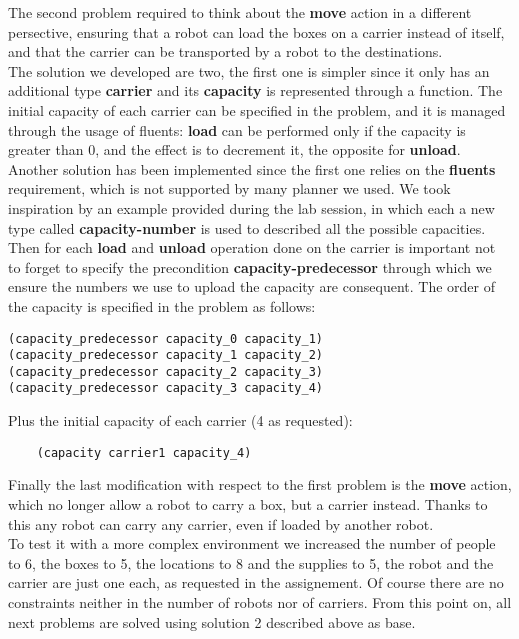 The second problem required to think about the \textbf{move} action in a different persective, 
ensuring that a robot can load the boxes on a carrier instead of itself, and that the carrier can be transported by a robot to the destinations.\\
The solution we developed are two, the first one is simpler since it only has an additional type \textbf{carrier} and its \textbf{capacity} is represented through a function.
The initial capacity of each carrier can be specified in the problem, and it is managed through the usage of fluents: \textbf{load} can be performed only if the capacity is greater than 0, and the effect is to decrement it, the opposite for \textbf{unload}.\\
Another solution has been implemented since the first one relies on the \textbf{fluents} requirement, which is not supported by many planner we used.
We took inspiration by an example provided during the lab session, in which each a new type called \textbf{capacity-number} is used to described all the possible capacities.
Then for each \textbf{load} and \textbf{unload} operation done on the carrier is important not to forget to specify the precondition \textbf{capacity-predecessor} through which we ensure the numbers we use to upload the capacity are consequent.
The order of the capacity is specified in the problem as follows:
\begin{verbatim}
(capacity_predecessor capacity_0 capacity_1)
(capacity_predecessor capacity_1 capacity_2)
(capacity_predecessor capacity_2 capacity_3)
(capacity_predecessor capacity_3 capacity_4)
\end{verbatim}
Plus the initial capacity of each carrier (4 as requested):
\begin{verbatim}
    (capacity carrier1 capacity_4)
\end{verbatim}
Finally the last modification with respect to the first problem is the \textbf{move} action, which no longer allow a robot to carry a box, but a carrier instead.
Thanks to this any robot can carry any carrier, even if loaded by another robot.\\
To test it with a more complex environment we increased the number of people to 6, the boxes to 5, the locations to 8 and the supplies to 5, the robot and the carrier are just one each, as requested in the assignement.
Of course there are no constraints neither in the number of robots nor of carriers.
From this point on, all next problems are solved using solution 2 described above as base.